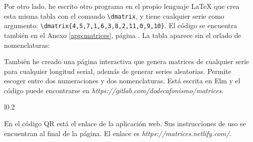 	
		Por otro lado, he escrito otro programa en el propio lenguaje \LaTeX{} que crea esta misma tabla con el comando \verb|\dmatrix|, y tiene cualquier serie como argumento: \verb|\dmatrix{4,5,7,1,6,3,8,2,11,0,9,10}|. El código se encuentra también en el Anexo \ref{app:matrices}, página \pageref{app:matrices2}. La tabla aparece sin el orlado de nomenclaturas:
	
		
		\bigbreak
		
		También he creado una página interactiva que genera matrices de cualquier serie para cualquier longitud serial, además de generar series aleatorias. Permite escoger entre dos numeraciones y dos nomenclaturas. Está escrita en Elm y el código puede encontrarse en \textit{https://gitlab.com/dodecafonismo/matrices}.
		
		\begin{wrapfigure}{l}{0.2\textwidth}
			\vspace{-\bigskipamount}
		\end{wrapfigure} En el código QR está el enlace de la aplicación web. Sus instrucciones de uso se encuentran al final de la página. El enlace es \textit{https://matrices.netlify.com/}.
		